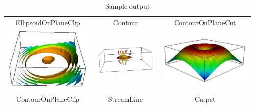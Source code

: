 \begin{table}[ht]
\begin{tabular}{c c c}
EllipsoidOnPlaneClip & Contour & ContourOnPlaneCut \\
\includegraphics[width=\thumbnailwidth]{figures/ContourOnPlaneClip} & 
\includegraphics[width=\thumbnailwidth]{figures/StreamLine} & 
\includegraphics[width=\thumbnailwidth]{figures/Carpet}  \\
ContourOnPlaneClip & StreamLine & Carpet \\
\end{tabular}
\caption{Sample output}
\end{table}



